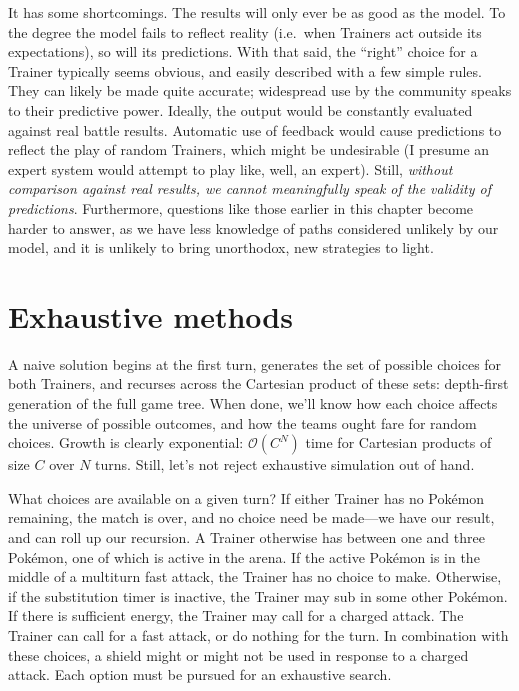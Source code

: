 It has some shortcomings.
The results will only ever be as good as the model.
To the degree the model fails to reflect reality (i.e.\ when Trainers act outside
 its expectations), so will its predictions.
With that said, the ``right'' choice for a Trainer typically seems obvious,
 and easily described with a few simple rules.
They can likely be made quite accurate; widespread use by the community speaks to their predictive power.
Ideally, the output would be constantly evaluated against real battle results.
Automatic use of feedback would cause predictions to reflect the play of random Trainers,
 which might be undesirable (I presume an expert system would attempt to play like, well, an expert).
Still, \textit{without comparison against real results, we cannot meaningfully speak of the validity of predictions}.
Furthermore, questions like those earlier in this chapter become harder to answer,
 as we have less knowledge of paths considered unlikely by our model,
 and it is unlikely to bring unorthodox, new strategies to light.

\section{Exhaustive methods}
\label{sec:exhaustive}
A naive solution begins at the first turn, generates the set of possible
  choices for both Trainers, and recurses across the Cartesian product
  of these sets: depth-first generation of the full game tree.
When done, we'll know how each choice affects the universe of possible outcomes,
  and how the teams ought fare for random choices.
Growth is clearly exponential: $\mathcal{O}(C^N)$ time for Cartesian products of size $C$ over $N$ turns.
Still, let's not reject exhaustive simulation out of hand.

What choices are available on a given turn?
If either Trainer has no Pokémon remaining, the match is over, and no choice
  need be made---we have our result, and can roll up our recursion.
A Trainer otherwise has between one and three Pokémon, one of which is active
  in the arena.
If the active Pokémon is in the middle of a multiturn fast attack, the
  Trainer has no choice to make.
Otherwise, if the substitution timer is inactive, the Trainer may sub in some other Pokémon.
If there is sufficient energy, the Trainer may call for a charged attack.
The Trainer can call for a fast attack, or do nothing for the turn.
In combination with these choices, a shield might or might not be used in response to a charged attack.
Each option must be pursued for an exhaustive search.

